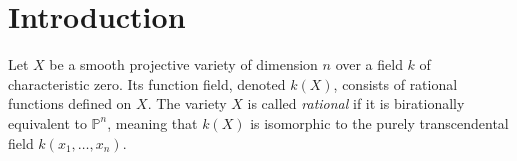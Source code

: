 \documentclass[12pt,a4paper]{amsart}
\theoremstyle{definition}
\theoremstyle{remark}
\newcommand{\Z}{\mathbb{Z}}
\begin{document}
\begin{abstract}
This paper introduces a novel framework for constructing invariants in $G$-equivariant birational geometry by unifying two recent approaches: the \emph{theory of atoms} developed by Katzarkov, Kontsevich, Pantev, and Yu, and the theory of \emph{modular symbols} due to Kontsevich, Tschinkel, and Pestun. 


We initiate the theory of Chen-Ruan atoms. Assuming the blowup formula for the quantum Chen-Ruan cohomology, we outline how to extend the theory of atoms to global quotient orbifolds and present some striking applications.

In addition, we develop a separate class of purely geometric invariants for $\mathbb{Z}/2$- and $\mathbb{Z}/3$-actions on surfaces and threefolds.

We provide many examples of non-$G$-linearizable $G$-actions on projective varieties treated with these new techniques.
\end{abstract}


\maketitle


\section{Introduction}


Let \( X \) be a smooth projective variety of dimension \( n \) over a field \( k \) of characteristic zero. Its function field, denoted \( k(X) \), consists of rational functions defined on \( X \). The variety $X$ is called \emph{rational} if it is birationally equivalent to \( \mathbb{P}^n \), meaning that \( k(X) \) is isomorphic to the purely transcendental field \( k(x_1, \ldots, x_n) \). 
\end{document}
